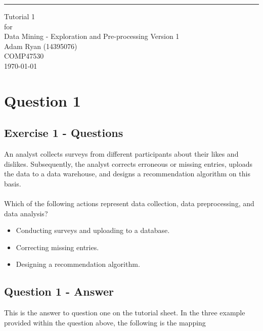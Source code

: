 \documentclass{scrreprt}
\date{}
\def\myversion{1 }
\begin{document}
	
	\begin{flushright}
		\rule{16cm}{5pt}\vskip1cm
		\begin{bfseries}
			\Huge{Tutorial 1\\}
			\vspace{1.9cm}
			for\\
			\vspace{1.9cm}
			Data Mining - Exploration and Pre-processing
			\vspace{1.9cm}
			\LARGE{Version \myversion}\\
			\vspace{1.9cm}
			Adam Ryan (14395076)\\
			\vspace{1.9cm}
			COMP47530\\
			\vspace{1.9cm}
			\today\\
		\end{bfseries}
	\end{flushright}
	
	\tableofcontents

	
\chapter{Question 1}
\section{Exercise 1 - Questions}\label{E1Q}
An analyst collects surveys from different participants about their likes and dislikes.
Subsequently, the analyst corrects erroneous or missing entries, uploads the data to a data warehouse, and designs a recommendation algorithm on this basis.
\\
\\
Which of the following actions represent data collection, data preprocessing, and data analysis?
\begin{itemize}
\item Conducting surveys and uploading to a database.
\item Correcting missing entries.
\item Designing a recommendation algorithm.
\end{itemize}

	
\section{Question 1 - Answer}
This is the answer to question one on the tutorial sheet. In the three example provided within the question above, the following is the mapping
\end{document}
